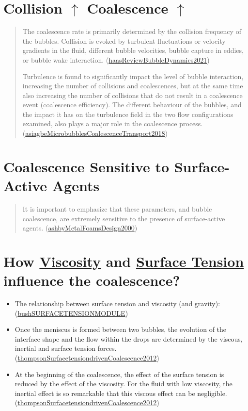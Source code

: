 \documentclass[11pt]{article}
\begin{document}
\section{Collision \(\uparrow\) Coalescence \(\uparrow\)}
\label{sec:orga87cbc7}
\begin{quote}
The coalescence rate is primarily determined by the collision frequency of the bubbles. Collision is evoked by turbulent fluctuations or velocity gradients in the fluid, different bubble velocities, bubble capture in eddies, or bubble wake interaction.
(\href{20240313153350-a_review_of_bubble_dynamics_in_liquid_metals.org}{haasReviewBubbleDynamics2021})

Turbulence is found to significantly impact the level of bubble interaction, increasing the number of collisions and coalescences, but at the same time also increasing the number of collisions that do not result in a coalescence event (coalescence efficiency). The different behaviour of the bubbles, and the impact it has on the turbulence field in the two flow configurations examined, also plays a major role in the coalescence process. (\href{20240318154731-microbubbles_coalescence_during_transport_in_vertical_channel_flows.org}{asiagbeMicrobubblesCoalescenceTransport2018})
\end{quote}
\section{Coalescence Sensitive to Surface-Active Agents}
\label{sec:orgc97d73a}
\begin{quote}
It is important to emphasize that these parameters, and bubble coalescence, are extremely sensitive to the presence of surface-active agents. (\href{20240318154429-metal_foams_a_design_guide.org}{ashbyMetalFoamsDesign2000})
\end{quote}
\section{How \href{20240313140039-viscosity.org}{Viscosity} and \href{20240312202630-surface_tension.org}{Surface Tension} influence the coalescence?}
\label{sec:org674bb5d}
\begin{itemize}
\item The relationship between surface tension and viscosity (and gravity): (\href{20240318122004-surface_tension_module.org}{bushSURFACETENSIONMODULE})
\item Once the meniscus is formed between two bubbles, the evolution of the interface shape and the flow within the drops are determined by the viscous, inertial and surface tension forces. (\href{20240318130039-surface_tension_driven_coalescence.org}{thompsonSurfacetensiondrivenCoalescence2012})
\item At the beginning of the coalescence, the effect of the surface tension is reduced by the effect of the viscosity. For the fluid with low viscosity, the inertial effect is so remarkable that this viscous effect can be negligible. (\href{20240318130039-surface_tension_driven_coalescence.org}{thompsonSurfacetensiondrivenCoalescence2012})

\printbibliography
\end{itemize}
\end{document}

